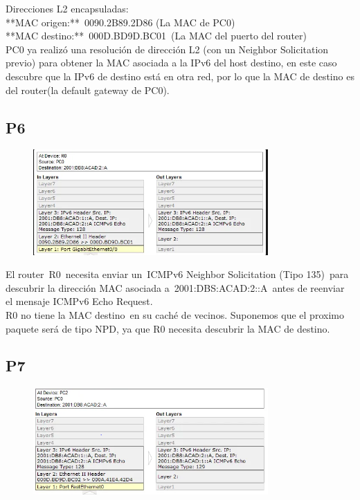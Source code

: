 \documentclass{article}
\begin{document}
Direcciones L2 encapsuladas:\\

**MAC origen:** 0090.2B89.2D86 (La MAC de PC0)\\
**MAC destino:** 000D.BD9D.BC01 (La MAC del puerto del router)\\

PC0 ya realizó una resolución de dirección L2 (con un Neighbor Solicitation previo) para obtener la MAC asociada a la IPv6 del host destino, en este caso descubre que la IPv6 de destino está en otra red, por lo que la MAC de destino es del router(la default gateway de PC0).

\subsection*{P6}
\begin{figure}[H] 
    \centering
    \includegraphics[width=0.8\textwidth]{imagen8.PNG}
    \caption{}
    \label{fig:ejemplo}
\end{figure}


El router R0 necesita enviar un ICMPv6 Neighbor Solicitation (Tipo 135) para descubrir la dirección MAC asociada a 2001:DBS:ACAD:2::A antes de reenviar el mensaje ICMPv6 Echo Request.\\

R0 no tiene la MAC destino en su caché de vecinos. Suponemos que el proximo paquete será de tipo NPD, ya que R0 necesita descubrir la MAC de destino.
\subsection*{P7}
\begin{figure}[H] 
    \centering
    \includegraphics[width=0.8\textwidth]{imagen9.PNG}
    \caption{}
    \label{fig:ejemplo}
\end{figure}
\end{document}
